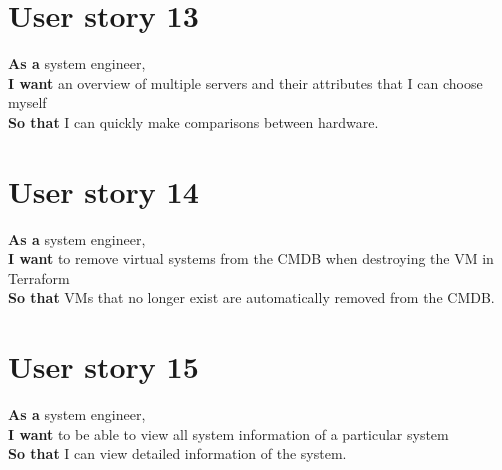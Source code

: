 \documentclass{article}
\begin{document}
\section{User story 13}
\textbf{As a} system engineer,
\\\textbf{I want} an overview of multiple servers and their attributes that I can choose myself
\\\textbf{So that} I can quickly make comparisons between hardware.

\section{User story 14}
\textbf{As a} system engineer,
\\\textbf{I want} to remove virtual systems from the CMDB when destroying the VM in Terraform
\\\textbf{So that} VMs that no longer exist are automatically removed from the CMDB.

\section{User story 15}
\textbf{As a} system engineer,
\\\textbf{I want} to be able to view all system information of a particular system
\\\textbf{So that} I can view detailed information of the system.
\end{document}
